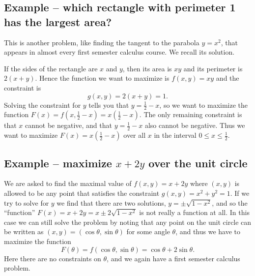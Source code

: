 \subsection{Example -- which rectangle with perimeter 1 has the largest area?}
\label{sec:isoperimetric-1}
This is another problem, like finding the tangent to the parabola $y=x^2$, that
appears in almost every first semester calculus course.  We recall its solution.

If the sides of the rectangle are $x$ and $y$, then its area is $xy$ and its
perimeter is $2(x+y)$.  Hence the function we want to maximize is $f(x, y) = xy$ and
the constraint is
\[
g(x, y) = 2(x+y) = 1.
\]
%
Solving the constraint for $y$ tells you that $y= \frac12-x$, so we want to maximize
the function $F(x) = f(x, \frac12 - x) = x(\frac12 - x)$.  The only remaining
constraint is that $x$ cannot be negative, and that $y=\frac12-x$ also cannot be
negative.  Thus we want to maximize $F(x) = x(\frac12-x)$ over all $x$ in the
interval $0\leq x\leq\frac12$.

\subsection{Example -- maximize $x+2y$ over the unit circle}

We are asked to find the maximal value of $f(x, y) = x+2y$ where $(x,y)$ is allowed
to be any point that satisfies the constraint $g(x, y) = x^2 + y^2 = 1$.  If we try
to solve for $y$ we find that there are two solutions, $y=\pm\sqrt{1-x^2}$, and so
the ``function'' $F(x) = x+2y = x\pm 2\sqrt{1-x^2}$ is not really a function at all.
In this case we can still solve the problem by noting that any point on the unit
circle can be written as $(x,y) = (\cos \theta, \sin \theta)$ for some angle
$\theta$, and thus we have to maximize the function
\[
F(\theta) = f(\cos \theta, \sin \theta) = \cos \theta + 2\sin \theta.
\]
Here there are no constraints on $\theta$, and we again have a first semester
calculus problem.


